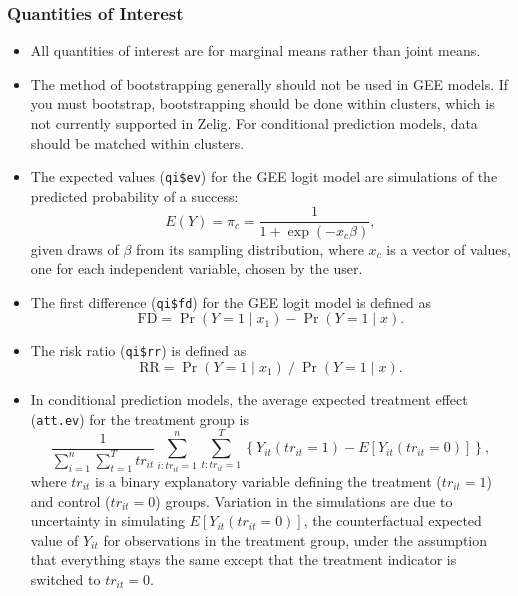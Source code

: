 \subsubsection{Quantities of Interest}
\begin{itemize}
\item All quantities of interest are for marginal means rather than joint means.
\item The method of bootstrapping generally should not be used in GEE models.  If you must bootstrap, bootstrapping should be done within clusters, which is not currently supported in Zelig.  For conditional prediction models, data should be matched within clusters.
\item The expected values ({\tt qi\$ev}) for the GEE logit model are
  simulations of the predicted probability of a success: $$E(Y) =
  \pi_{c}= \frac{1}{1 + \exp(-x_{c} \beta)},$$ given draws of $\beta$ from
  its sampling distribution, where $x_{c}$ is a vector of values, one for
each independent variable, chosen by the user.

\item The first difference ({\tt qi\$fd}) for the GEE logit model is defined as
\begin{equation*}
\textrm{FD} = \Pr(Y = 1 \mid x_1) - \Pr(Y = 1 \mid x).
\end{equation*}

\item The risk ratio ({\tt qi\$rr}) is defined as
\begin{equation*}
\textrm{RR} = \Pr(Y = 1 \mid x_1) \ / \ \Pr(Y = 1 \mid x).
\end{equation*}

\item In conditional prediction models, the average expected treatment
  effect ({\tt att.ev}) for the treatment group is
    \begin{equation*} \frac{1}{\sum_{i=1}^n \sum_{t=1}^T tr_{it}}\sum_{i:tr_{it}=1}^n \sum_{t:tr_{it}=1}^T \left\{ Y_{it}(tr_{it}=1) -
      E[Y_{it}(tr_{it}=0)] \right\},
    \end{equation*}
    where $tr_{it}$ is a binary explanatory variable defining the treatment
    ($tr_{it}=1$) and control ($tr_{it}=0$) groups.  Variation in the
    simulations are due to uncertainty in simulating $E[Y_{it}(tr_{it}=0)]$,
    the counterfactual expected value of $Y_{it}$ for observations in the
    treatment group, under the assumption that everything stays the
    same except that the treatment indicator is switched to $tr_{it}=0$.

\end{itemize}

